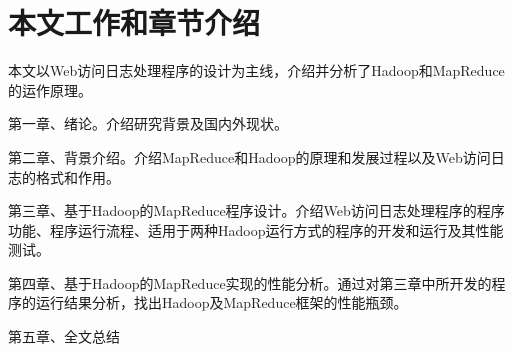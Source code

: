 \section{本文工作和章节介绍}
本文以Web访问日志处理程序的设计为主线，介绍并分析了Hadoop和MapReduce的运作原理。

第一章、绪论。介绍研究背景及国内外现状。

第二章、背景介绍。介绍MapReduce和Hadoop的原理和发展过程以及Web访问日志的格式和作用。

第三章、基于Hadoop的MapReduce程序设计。介绍Web访问日志处理程序的程序功能、程序运行流程、适用于两种Hadoop运行方式的程序的开发和运行及其性能测试。

第四章、基于Hadoop的MapReduce实现的性能分析。通过对第三章中所开发的程序的运行结果分析，找出Hadoop及MapReduce框架的性能瓶颈。

第五章、全文总结